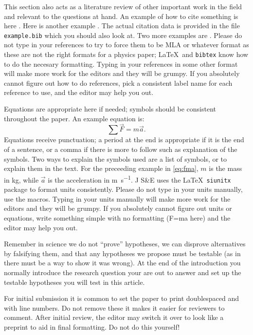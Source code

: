 \documentclass[amsmath,amssymb,aps,endfloats,linenumbers]{revtex4-2}
\begin{document}
This section also acts as a literature review of other important work in the field and relevant to the questions at hand. An example of how to cite something is here \cite{tipler}. Here is another example \cite{openstax}. The actual citation data is provided in the file \texttt{example.bib} which you should also look at. Two more examples are \cite{rombauer:1931:joy, binzel:1988:hemispherical}. Please do not type in your references to try to force them to be MLA or whatever format as these are not the right formats for a physics paper; \LaTeX\ and \texttt{bibtex} know how to do the necesary formatting. Typing in your references in some other format will make more work for the editors and they will be grumpy. If you absolutely cannot figure out how to do references, pick a consistent label name for each reference to use, and the editor may help you out. 

Equations are appropriate here if needed; symbols should be consistent throughout the paper. An example equation is:
\begin{equation}
\sum \vec{F} = m \vec{a}.
\label{eq:fma} %
\end{equation}
Equations receive punctuation; a period at the end is appropriate if it is the end of a sentence, or a comma if there is more to follow such as explanation of the symbols. Two ways to explain the symbols used are a list of symbols, or to explain them in the text. For the preceeding example in \cref{eq:fma}, $m$ is the mass in \unit{\kilo\gram}, while $\vec{a}$ is the acceleration in \unit{\meter\per\second}. J S\&E uses the \LaTeX\ \texttt{siunitx} package to format units consistently. Please do not type in your units manually, use the macros. Typing in your units manually will make more work for the editors and they will be grumpy. If you absolutely cannot figure out units or equations, write something simple with no formatting (F=ma here) and the editor may help you out. 

Remember in science we do not ``prove'' hypotheses, we can disprove alternatives by falsifying them, and that any hypotheses we propose must be testable (as in there must be a way to show it was wrong). At the end of the introduction you normally introduce the research question your are out to answer and set up the testable hypotheses you will test in this article. 

For initial submission it is common to set the paper to print doublespaced and with line numbers. Do not remove these it makes it easier for reviewers to comment. After initial review, the editor may switch it over to look like a preprint to aid in final formatting. Do not do this yourself! 
\end{document}
